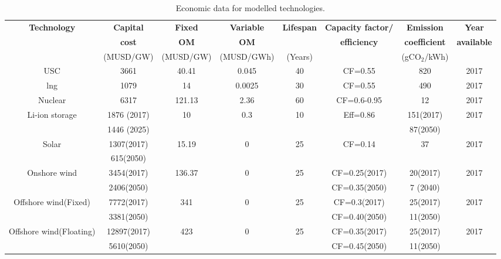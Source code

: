 \begin{landscape}
\begin{longtable}{ |*{8}{c|} }
\caption{Economic data for modelled technologies.}\\
\hline
\textbf{Technology} & \textbf{Capital} & \textbf{Fixed} & \textbf{Variable} & \textbf{Lifespan} & \textbf{Capacity factor/} & \textbf{Emission} & \textbf{Year} \\
 & \textbf{cost} & \textbf{\gls{OM}} & \textbf{\gls{OM}} &  & \textbf{efficiency} & \textbf{coefficient} & \textbf{available} \\
 & (MUSD/GW) & (MUSD/GW) & (MUSD/GWh) & (Years)  &  & (gCO$_2$/kWh)  &  \\
\hline
\endhead  %
\hline
\endfoot  %
\hline
\endlastfoot
\gls{USC} \cite{eia_cost_2020,ipcc_climate_2014} & 3661 & 40.41 & 0.045 & 40 & CF=0.55 & 820 & 2017 \\
\gls{lng}\cite{eia_cost_2020,ipcc_climate_2014} & 1079 & 14 & 0.0025 & 30 & CF=0.55 & 490 & 2017 \\
Nuclear \cite{eia_cost_2020,ipcc_climate_2014,lokhov_load-following_2011} & 6317 & 121.13 & 2.36 & 60 & CF=0.6-0.95 & 12 & 2017 \\
Li-ion storage \cite{mongird_energy_2019,emilsson_lithium-ion_2019,oliveira_environmental_2015} & 1876 (2017) & 10 & 0.3 & 10 & Eff=0.86 & 151(2017) & 2017 \\
 & 1446 (2025) &  &  &  &  & 87(2050) &  \\
Solar \cite{eia_cost_2020,ipcc_climate_2014} & 1307(2017) & 15.19 & 0  & 25 & CF=0.14 & 37 & 2017 \\
 & 615(2050) & & & & & &  \\
Onshore wind & 3454(2017) & 136.37 & 0 & 25 & CF=0.25(2017) & 20(2017) & 2017 \\
\cite{eia_cost_2020,ipcc_climate_2014,kato_energy_2016,govindji_appraisal_2012,heger_wind_2016,bonou_life_2016} & 2406(2050) &  &  &  & CF=0.35(2050) & 7 (2040) &  \\
Offshore wind(Fixed) & 7772(2017) & 341 & 0 & 25 & CF=0.3(2017) & 25(2017) & 2017 \\
\cite{eia_cost_2020,ipcc_climate_2014,kato_energy_2016,govindji_appraisal_2012,heger_wind_2016,bonou_life_2016} & 3381(2050) &  &  & & CF=0.40(2050) & 11(2050) &  \\
Offshore wind(Floating) & 12897(2017) & 423 & 0 & 25 & CF=0.35(2017) & 25(2017) & 2017 \\
\cite{eia_cost_2020,ipcc_climate_2014,kato_energy_2016,govindji_appraisal_2012,heger_wind_2016,bonou_life_2016} & 5610(2050) &  &  &  & CF=0.45(2050) & 11(2050) &  \\

\end{longtable}
\end{landscape}
